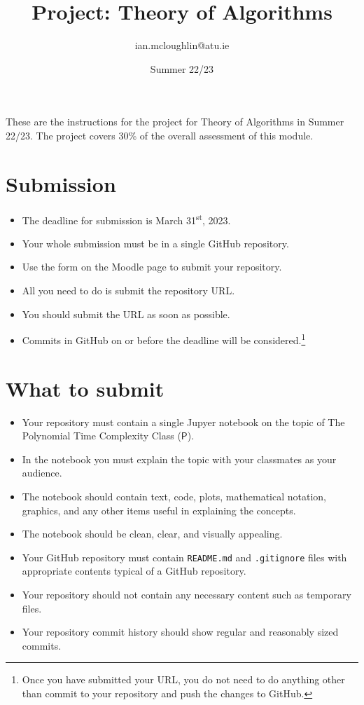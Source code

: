 \documentclass{iansnotes}
\title{Project: Theory of Algorithms}
\author{ian.mcloughlin@atu.ie}
\date{Summer 22/23}
\begin{document}
 
\maketitle

These are the instructions for the project for Theory of Algorithms in Summer 22/23.
The project covers 30\% of the overall assessment of this module.


\section{Submission}

\begin{itemize}
  \item The deadline for submission is March 31\textsuperscript{st}, 2023. 
  \item Your whole submission must be in a single GitHub repository.
  \item Use the form on the Moodle page to submit your repository.
  \item All you need to do is submit the repository URL.
  \item You should submit the URL as soon as possible.
  \item Commits in GitHub on or before the deadline will be considered.\footnote{Once you have submitted your URL, you do not need to do anything other than commit to your repository and push the changes to GitHub.}
\end{itemize}


\section{What to submit}

\begin{itemize}
  \item Your repository must contain a single Jupyer notebook on the topic of The Polynomial Time Complexity Class ($\textsf{P}$).
  \item In the notebook you must explain the topic with your classmates as your audience.
  \item The notebook should contain text, code, plots, mathematical notation, graphics, and any other items useful in explaining the concepts.
  \item The notebook should be clean, clear, and visually appealing.
  \item Your GitHub repository must contain \texttt{README.md} and \texttt{.gitignore} files with appropriate contents typical of a GitHub repository.
  \item Your repository should not contain any necessary content such as temporary files.
  \item Your repository commit history should show regular and reasonably sized commits.
\end{itemize}
\end{document}
